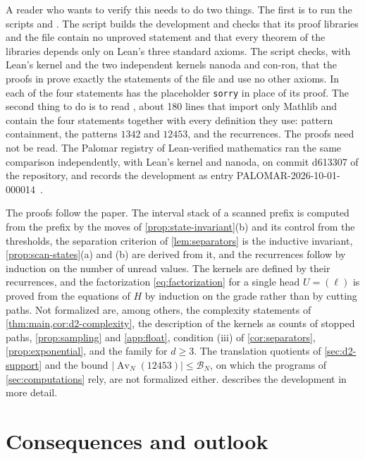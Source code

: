 \documentclass[11pt,reqno]{amsart}
\theoremstyle{definition}
\theoremstyle{remark}
\newcommand{\Av}{\operatorname{Av}}
\begin{document}
A reader who wants to verify this needs to do two things.  The first
is to run the scripts  and .  The script
 builds the development and checks that its proof libraries
and the file  contain no unproved statement and that
every theorem of the libraries depends only on Lean's three standard axioms.
The script  checks, with Lean's kernel and the two
independent kernels nanoda and con-ron, that the proofs in
 prove exactly the statements of the file
 and use no other axioms.  In  each
of the four statements has the placeholder \texttt{sorry} in place of its
proof.  The second thing to do is to read , about
180 lines that import only Mathlib and contain the four statements together
with every definition they use: pattern containment, the patterns $1342$ and
$12453$, and the recurrences.  The proofs need not be read.  The Palomar
registry of Lean-verified mathematics ran the same comparison
independently, with Lean's kernel and nanoda, on commit d613307 of the
repository, and records the development as entry
PALOMAR-2026-10-01-000014~\cite{PalomarEntry2026}.

The proofs follow the paper.  The interval stack of a scanned prefix is
computed from the prefix by the moves of \cref{prop:state-invariant}(b) and
its control from the thresholds, the separation criterion of \cref{lem:separators} is the
inductive invariant, \cref{prop:scan-states}(a) and (b) are derived from it,
and the recurrences follow by induction on the number of unread values.  The
kernels are defined by their recurrences, and the factorization
\eqref{eq:factorization} for a single head $U=(\ell)$ is proved from the
equations of $H$ by induction on the grade rather than by cutting paths.
Not formalized are, among others, the complexity statements of
\cref{thm:main,cor:d2-complexity}, the description of the kernels as counts
of stopped paths, \cref{prop:sampling} and \cref{app:float}, condition (iii)
of \cref{cor:separators}, \cref{prop:exponential}, and the family for
$d\geq3$.  The translation quotients of \cref{sec:d2-support} and the bound
$\lvert\Av_N(12453)\rvert\leq\mathcal B_N$, on which the programs of
\cref{sec:computations} rely, are not formalized either.   describes the development in more
detail.

\section{Consequences and outlook}\label{sec:discussion}
\end{document}
